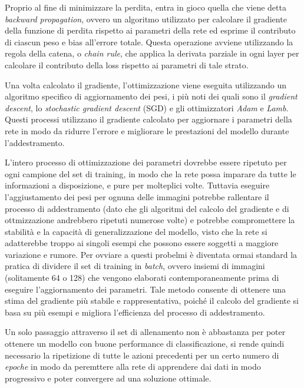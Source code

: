 Proprio al fine di minimizzare la perdita, entra in gioco quella che viene detta \textit{backward propagation}, ovvero un algoritmo utilizzato per calcolare il gradiente della funzione di perdita rispetto ai parametri della rete ed esprime il contributo di ciascun peso e bias all'errore totale. Questa operazione avviene utilizzando la regola della catena, o \textit{chain rule}, che applica la derivata parziale in ogni layer per calcolare il contributo della loss rispetto ai parametri di tale strato.

Una volta calcolato il gradiente, l'ottimizzazione viene eseguita utilizzando un algoritmo specifico di aggiornamento dei pesi, i più noti dei quali sono il \textit{gradient descent}, lo \textit{stochastic gradient descent} (SGD) e gli ottimizzatori \textit{Adam} e \textit{Lamb}. Questi processi utilizzano il gradiente calcolato per aggiornare i parametri della rete in modo da ridurre l'errore e migliorare le prestazioni del modello durante l'addestramento.

L'intero processo di ottimizzazione dei parametri dovrebbe essere ripetuto per ogni campione del set di training, in modo che la rete possa imparare da tutte le informazioni a disposizione, e pure per molteplici volte. Tuttavia eseguire l'aggiustamento dei pesi per ognuna delle immagini potrebbe rallentare il processo di addestramento (dato che gli algoritmi del calcolo del gradiente e di ottmizzazione andrebbero ripetuti numerose volte) e potrebbe compromettere la stabilità e la capacità di generalizzazione del modello, visto che la rete si adatterebbe troppo ai singoli esempi che possono essere soggetti a maggiore variazione e rumore.
Per ovviare a questi probelmi è diventata ormai standard la pratica di dividere il set di training in \textit{batch}, ovvero insiemi di immagini (solitamente 64 o 128) che vengono elaborati contemporaneamente prima di eseguire l'aggiornamento dei parametri. Tale metodo consente di ottenere una stima del gradiente più stabile e rappresentativa, poiché il calcolo del gradiente si basa su più esempi e migliora l'efficienza del processo di addestramento.

Un solo passaggio attraverso il set di allenamento non è abbastanza per poter ottenere un modello con buone performance di classificazione, si rende quindi necessario la ripetizione di tutte le azioni precedenti per un certo numero di \textit{epoche} in modo da peremttere alla rete di apprendere dai dati in modo progressivo e poter convergere ad una soluzione ottimale.

